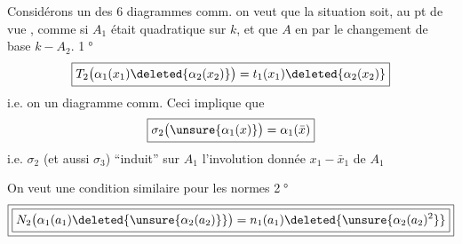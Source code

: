 Considérons un des 6 diagrammes comm.
on veut que la situation soit, au pt de vue , comme si $A_1$ était quadratique sur $k$, et que $A$ en  par le changement de base $k\mathbin{-}A_2$.
\textcircled{1°}
\[
\boxed{T_2\bigl(\alpha_1(x_1)\deleted{\alpha_2(x_2)}\bigr)=t_1(x_1)\deleted{\alpha_2(x_2)}}
\]
i.e. on  un diagramme comm.
Ceci implique que
\[
\boxed{\sigma_2\bigl(\unsure{\alpha_1(x)}\bigr)=\alpha_1(\bar x)}
\]
i.e. $\sigma_2$ (et aussi $\sigma_3$) ``induit'' sur $A_1$ l'involution donnée $x_1\mathbin{-}\bar x_1$ de $A_1$

On veut une condition similaire pour les normes
\textcircled{2°}
\[
\boxed{\boxed{N_2\bigl(\alpha_1(a_1)\deleted{\unsure{\alpha_2(a_2)}}\bigr)=n_1(a_1)\deleted{\unsure{\alpha_2(a_2)^2}}}}
\]

